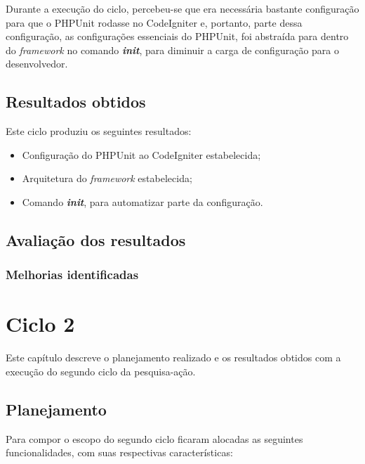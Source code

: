 	  Durante a execução do ciclo, percebeu-se que era necessária bastante configuração para que o PHPUnit rodasse no
	  CodeIgniter e, portanto, parte dessa configuração, as configurações essenciais do PHPUnit, foi abstraída para
	  dentro do \textit{framework} no comando \textit{\textbf{init}}, para diminuir a carga de configuração
	  para o desenvolvedor.
  
  \section{Resultados obtidos}
    
      Este ciclo produziu os seguintes resultados:
      
      \begin{itemize}

	\item Configuração do PHPUnit ao CodeIgniter estabelecida;
	
	\item Arquitetura do \textit{framework} estabelecida;
	
	\item Comando \textit{\textbf{init}}, para automatizar parte da configuração.

      \end{itemize}

  \section{Avaliação dos resultados}
  
      \subsection{Melhorias identificadas}
    

\chapter{Ciclo 2}

  Este capítulo descreve o planejamento realizado e os resultados obtidos com a execução do segundo ciclo da pesquisa-ação.
  
  \section{Planejamento}
  
      Para compor o escopo do segundo ciclo ficaram alocadas as seguintes funcionalidades, com suas respectivas características:
      
